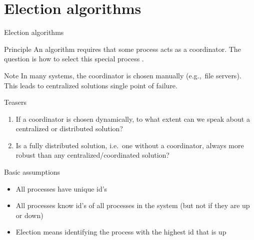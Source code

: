 \section{Election algorithms}
\begin{frame}{Election algorithms}
  \begin{block}{Principle}
    An algorithm requires that some process acts as a coordinator. The question is how to select this special
    process .
  \end{block}
  \begin{block}{Note}
    In many systems, the coordinator is chosen manually (e.g.,\ file servers). This leads to centralized
    solutions \mathexpr{\Rightarrow} single point of failure.
  \end{block}
  \begin{block}{Teasers}
    \begin{enumerate}
      \item If a coordinator is chosen dynamically, to what extent can we speak about a centralized or
            distributed solution?
      \item Is a fully distributed solution, i.e.\ one without a coordinator, always more robust than any
            centralized/coordinated solution?
    \end{enumerate}
  \end{block}
\end{frame}
\begin{frame}{Basic assumptions}
  \begin{block}{}
    \begin{itemize}
      \item All processes have unique id's
      \item All processes know id's of all processes in the system (but not if they are up or down)
      \item Election means identifying the process with the highest id that is up
    \end{itemize}
  \end{block}
\end{frame}
